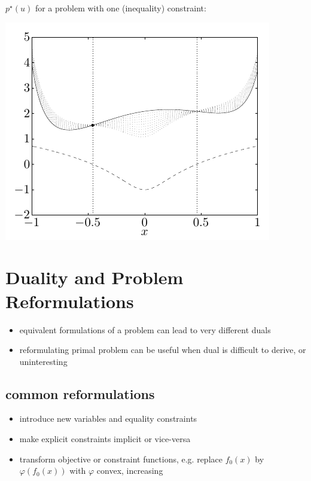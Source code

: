 \documentclass[11pt]{extarticle}
\theoremstyle{definition}
\begin{document}
\begin{minipage}{0.45\textwidth}\vspace{-2mm}
  $p^\star(u)$ for a problem with one (inequality) constraint: 
\end{minipage}
\begin{minipage}{0.55\textwidth}\vspace{-2mm}
  \begin{center}
    \includegraphics[scale=0.55,page=10]{fig/05.pdf}
  \end{center}
\end{minipage}

\newpage

\section*{Duality and Problem Reformulations}

\begin{itemize}
  \item equivalent formulations of a problem can lead to very different duals
  \item reformulating primal problem can be useful when dual is difficult to derive, or uninteresting
\end{itemize}

\subsection*{common reformulations}

\begin{itemize}
  \item introduce new variables and equality constraints
  \item make explicit constraints implicit or vice-versa
  \item transform objective or constraint functions, e.g. replace $f_0(x)$ by $\varphi(f_0(x))$ with $\varphi$ convex, increasing
\end{itemize}
\end{document}
